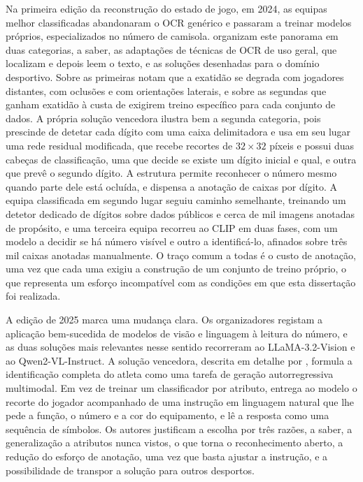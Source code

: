 Na primeira edição da reconstrução do estado de jogo, em 2024, as equipas melhor
classificadas abandonaram o OCR genérico e passaram a treinar modelos próprios,
especializados no número de camisola. \citet{golovkin2025minimap} organizam este panorama
em duas categorias, a saber, as adaptações de técnicas de OCR de uso geral, que localizam
e depois leem o texto, e as soluções desenhadas para o domínio desportivo. Sobre as
primeiras notam que a exatidão se degrada com jogadores distantes, com oclusões e com
orientações laterais, e sobre as segundas que ganham exatidão à custa de exigirem treino
específico para cada conjunto de dados. A própria solução vencedora ilustra bem a segunda
categoria, pois prescinde de detetar cada dígito com uma caixa delimitadora e usa em seu
lugar uma rede residual modificada, que recebe recortes de $32\times32$ píxeis e possui
duas cabeças de classificação, uma que decide se existe um dígito inicial e qual, e outra
que prevê o segundo dígito. A estrutura permite reconhecer o número mesmo quando parte
dele está ocluída, e dispensa a anotação de caixas por dígito. A equipa classificada em
segundo lugar seguiu caminho semelhante, treinando um detetor dedicado de dígitos sobre
dados públicos e cerca de mil imagens anotadas de propósito, e uma terceira equipa
recorreu ao CLIP em duas fases, com um modelo a decidir se há número visível e outro a
identificá-lo, afinados sobre três mil caixas anotadas manualmente. O traço comum a todas
é o custo de anotação, uma vez que cada uma exigiu a construção de um conjunto de treino
próprio, o que representa um esforço incompatível com as condições em que esta dissertação
foi realizada.

A edição de 2025 marca uma mudança clara. Os organizadores registam a aplicação
bem-sucedida de modelos de visão e linguagem à leitura do número, e as duas soluções mais
relevantes nesse sentido recorreram ao LLaMA-3.2-Vision e ao Qwen2-VL-Instruct. A solução
vencedora, descrita em detalhe por \citet{oo2026broadcast2pitch}, formula a identificação
completa do atleta como uma tarefa de geração autorregressiva multimodal. Em vez de treinar
um classificador por atributo, entrega ao modelo o recorte do jogador acompanhado de uma
instrução em linguagem natural que lhe pede a função, o número e a cor do equipamento, e lê
a resposta como uma sequência de símbolos. Os autores justificam a escolha por três razões,
a saber, a generalização a atributos nunca vistos, o que torna o reconhecimento aberto, a
redução do esforço de anotação, uma vez que basta ajustar a instrução, e a possibilidade de
transpor a solução para outros desportos.

